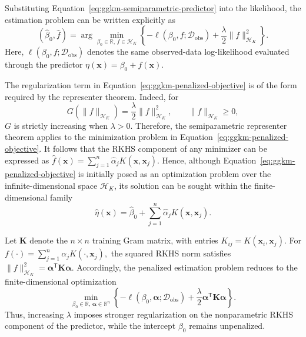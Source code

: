 {	Substituting
	Equation~\eqref{eq:ggkm-semiparametric-predictor} into the likelihood,
	the estimation problem can be written explicitly as
	\begin{equation}
	    (\widehat{\beta}_0,\widehat f)
	    =
	    \arg\min_{
	        \beta_0\in\mathbb R,\,
	        f\in\mathcal H_K
	    }
	    \left\{
	        -\ell(\beta_0,f;\mathcal D_{\text{obs}})
	        +
	        \frac{\lambda}{2}
	        \|f\|_{\mathcal H_K}^{2}
	    \right\}.
	    \label{eq:ggkm-penalized-objective}
	\end{equation}
	Here, $\ell(\beta_0,f;\mathcal D_{\text{obs}})$ denotes the same observed-data
	log-likelihood evaluated through the predictor
	$\eta(\bm{x})=\beta_0+f(\bm{x})$.

	The regularization term in
	Equation~\eqref{eq:ggkm-penalized-objective} is of the form required by
	the representer theorem. Indeed, for
	\begin{equation*}
	    G(\|f\|_{\mathcal H_K})
	    =
	    \frac{\lambda}{2}\|f\|_{\mathcal H_K}^{2},
	    \qquad
	    \|f\|_{\mathcal H_K}\geq 0,
	\end{equation*}
	$G$ is strictly increasing when $\lambda>0$. Therefore, the
	semiparametric representer theorem applies to the minimization problem
	in Equation~\eqref{eq:ggkm-penalized-objective}. It follows that the
	RKHS component of any minimizer can be expressed as
	$
	    \widehat f(\bm{x})
	    =
	    \sum_{j=1}^{n}
	        \widehat{\alpha}_j
	        K(\bm{x},\bm{x}_j).
	$
	Hence, although
	Equation~\eqref{eq:ggkm-penalized-objective} is initially posed as an
	optimization problem over the infinite-dimensional space
	$\mathcal H_K$, its solution can be sought within the finite-dimensional
	family
	\begin{equation}
	    \widehat{\eta}(\bm{x})
	    =
	    \widehat{\beta}_0
	    +
	    \sum_{j=1}^{n}
	        \widehat{\alpha}_j
	        K(\bm{x},\bm{x}_j).
	    \label{eq:rkhs-predictor}
	\end{equation}

	Let $\bm K$ denote the $n\times n$ training Gram matrix, with entries
	$
	    K_{ij}
	    =
	    K(\bm{x}_i,\bm{x}_j).
	$
	For
	$
	    f(\cdot)
	    =
	    \sum_{j=1}^{n}
	        \alpha_j K(\cdot,\bm{x}_j),
	$
	the squared RKHS norm satisfies
	$
	    \|f\|_{\mathcal H_K}^{2}
	    =
	    \bm{\alpha}^{\mathsf T}
	    \bm K
	    \bm{\alpha}.
	$
	Accordingly, the penalized estimation problem reduces to the
	finite-dimensional optimization
	\begin{equation}
	    \min_{\beta_0\in\mathbb R,\,
	         \bm{\alpha}\in\mathbb R^n}
	    \left\{
	        -\ell(\beta_0,\bm{\alpha};\mathcal D_{\text{obs}})
	        +
	        \frac{\lambda}{2}
	        \bm{\alpha}^{\mathsf T}
	        \bm K
	        \bm{\alpha}
	    \right\}.
	    \label{eq:ggkm-finite-objective}
	\end{equation}
	Thus, increasing $\lambda$ imposes stronger regularization on the
	nonparametric RKHS component of the predictor, while the intercept
	$\beta_0$ remains unpenalized.

}
